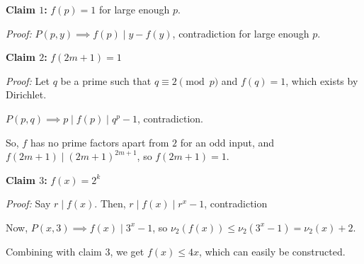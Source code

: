\documentclass[10pt,letterpaper]{article}
\begin{document}
\textbf{Claim $1$:} $f(p)=1$ for large enough $p$.

\emph{Proof:} $P(p,y)\implies f(p)\mid y-f(y)$, contradiction for large enough $p$.

\textbf{Claim $2$:} $f(2m+1)=1$

\emph{Proof:} Let $q$ be a prime such that $q\equiv 2\pmod p$ and $f(q)=1$, which exists by Dirichlet.

$P(p,q)\implies p\mid f(p)\mid q^p-1$, contradiction.

So, $f$ has no prime factors apart from $2$ for an odd input, and $f(2m+1)\mid (2m+1)^{2m+1}$, so $f(2m+1)=1$.

\textbf{Claim $3$:} $f(x)=2^k$

\emph{Proof:} Say $r\mid f(x)$. Then, $r\mid f(x)\mid r^x-1$, contradiction

Now, $P(x,3)\implies f(x)\mid 3^x-1$, so $\nu_2(f(x))\le \nu_2(3^x-1)=\nu_2(x)+2$.

Combining with claim $3$, we get $f(x)\le 4x$, which can easily be constructed.
\par{}
\par

\end{document}
